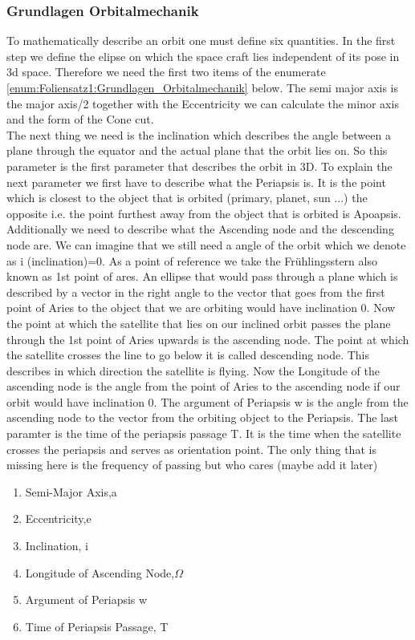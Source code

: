 \subsubsection{Grundlagen Orbitalmechanik}
To mathematically describe an orbit one must define six quantities.
In the first step we define the elipse on which the space craft lies independent of its pose in 3d space. Therefore we need the first two items of the enumerate \ref{enum:Foliensatz1:Grundlagen_Orbitalmechanik} below. The semi major axis is the major axis/2 together with the Eccentricity we can calculate the minor axis and the form of the Cone cut.\\ The next thing we need is the inclination which describes the angle between a plane through the equator and the actual plane that the orbit lies on. So this parameter is the first parameter that describes the orbit in 3D. To explain the next parameter we first have to describe what the Periapsis is. It is the point which is closest to the object that is orbited (primary, planet, sun ...) the opposite i.e. the point furthest away from the object that is orbited is Apoapsis. Additionally we need to describe what the Ascending node and the descending node are. We can imagine that we still need a angle of the orbit which we denote as i (inclination)=0. As a point of reference we take the Frühlingsstern also known as 1st point of ares. An ellipse that would pass through a plane which is described by a vector in the right angle to the vector that goes from the first point of Aries to the object that we are orbiting would have inclination 0. Now the point at which the satellite that lies on our inclined orbit passes the plane through the 1st point of Aries upwards is the ascending node. The point at which the satellite crosses the line to go below it is called descending node. This describes in which direction the satellite is flying. Now the Longitude of the ascending node is the angle from the point of Aries to the ascending node if our orbit would have inclination 0. The argument of Periapsis w is the angle from the ascending node to the vector from the orbiting object to the Periapsis. The last paramter is the time of the periapsis passage T. It is the time when the satellite crosses the periapsis and serves as orientation point. The only thing that is missing here is the frequency of passing but who cares (maybe add it later) 
\begin{enumerate}
\label{enum:Foliensatz1:Grundlagen_Orbitalmechanik}
    \item Semi-Major Axis,a
    \item Eccentricity,e
    \item Inclination, i
    \item Longitude of Ascending Node,$\Omega$
    \item Argument of Periapsis w
    \item Time of Periapsis Passage, T
\end{enumerate}

